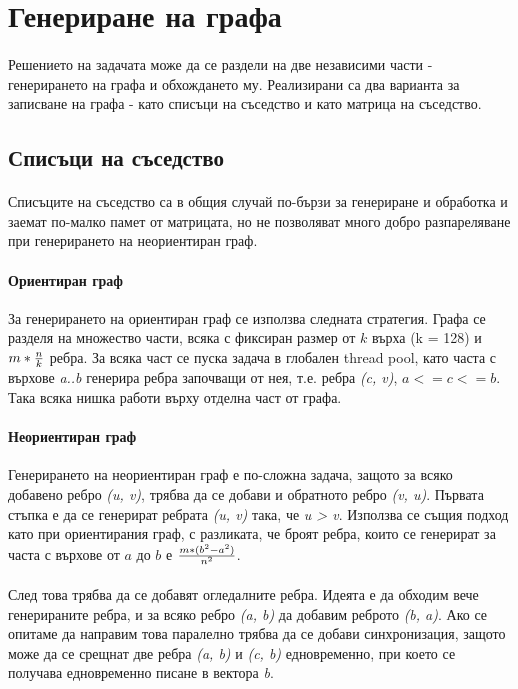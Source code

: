 \section{Генериране на графа}

\paragraph*{} Решението на задачата може да се раздели на две независими части - генерирането на графа и обхождането му. Реализирани са два варианта за записване на графа - като списъци на съседство и като матрица на съседство.

\subsection{Списъци на съседство}

\paragraph*{} Списъците на съседство са в общия случай по-бързи за генериране и обработка и заемат по-малко памет от матрицата, но не позволяват много добро разпареляване при генерирането на неориентиран граф.

\paragraph*{Ориентиран граф} За генерирането на ориентиран граф се използва следната стратегия. Графа се разделя на множество части, всяка с фиксиран размер от $k$ върха (k = 128) и $m * {n \over k}$ ребра. За всяка част се пуска задача в глобален thread pool, като часта с върхове \textit{a..b} генерира ребра започващи от нея, т.е. ребра \textit{(c, v)}, $a <= c <= b$. Така всяка нишка работи върху отделна част от графа.

\paragraph*{Неориентиран граф} Генерирането на неориентиран граф е по-сложна задача, защото за всяко добавено ребро \textit{(u, v)}, трябва да се добави и обратното ребро \textit{(v, u)}. Първата стъпка е да се генерират ребрата \textit{(u, v)} така, че \textit{u > v}. Използва се същия подход като при ориентирания граф, с разликата, че броят ребра, които се генерират за часта с върхове от $a$ до $b$ е $m * (b^2 - a^2) \over n^2$.

\paragraph*{} След това трябва да се добавят огледалните ребра. Идеята е да обходим вече генерираните ребра, и за всяко ребро \textit{(a, b)} да добавим реброто \textit{(b, a)}. Ако се опитаме да направим това паралелно трябва да се добави синхронизация, защото може да се срещнат две ребра \textit{(a, b)} и \textit{(c, b)} едновременно, при което се получава едновременно писане в вектора \textit{b}.

